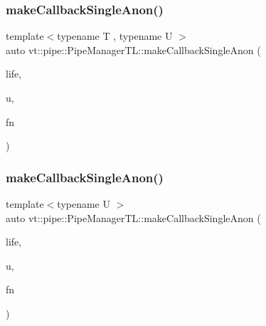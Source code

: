 \subsubsection{\texorpdfstring{make\+Callback\+Single\+Anon()}{makeCallbackSingleAnon()}\hspace{0.1cm}{\footnotesize\ttfamily [2/6]}}
{\footnotesize\ttfamily template$<$typename T , typename U $>$ \\
auto vt\+::pipe\+::\+Pipe\+Manager\+T\+L\+::make\+Callback\+Single\+Anon (\begin{DoxyParamCaption}\item[{\hyperlink{namespacevt_1_1pipe_acb42b284378c0fdac1d7c6335dc26f58}{Lifetime\+Enum}}]{life,  }\item[{U $\ast$}]{u,  }\item[{\hyperlink{structvt_1_1pipe_1_1_pipe_manager_base_a73fdf82ece0411b3dc644c99b763f7a9}{Func\+Msg\+Ctx\+Type}$<$ T, U $>$}]{fn }\end{DoxyParamCaption})}

\mbox{\label{structvt_1_1pipe_1_1_pipe_manager_t_l_a07b4b67231348cb486b6c796152c27f2}} 
\subsubsection{\texorpdfstring{make\+Callback\+Single\+Anon()}{makeCallbackSingleAnon()}\hspace{0.1cm}{\footnotesize\ttfamily [3/6]}}
{\footnotesize\ttfamily template$<$typename U $>$ \\
auto vt\+::pipe\+::\+Pipe\+Manager\+T\+L\+::make\+Callback\+Single\+Anon (\begin{DoxyParamCaption}\item[{\hyperlink{namespacevt_1_1pipe_acb42b284378c0fdac1d7c6335dc26f58}{Lifetime\+Enum}}]{life,  }\item[{U $\ast$}]{u,  }\item[{\hyperlink{structvt_1_1pipe_1_1_pipe_manager_base_ad8463823b6b4cfdb67c119d6d22e3bac}{Func\+Ctx\+Type}$<$ U $>$}]{fn }\end{DoxyParamCaption})}

\mbox{\label{structvt_1_1pipe_1_1_pipe_manager_t_l_a974ab3bbfc8a972f5d016ebf70c5a6d7}} 
